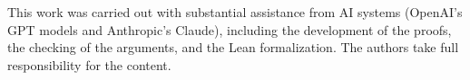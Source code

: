 This work was carried out with substantial assistance from AI systems (OpenAI's GPT models and
Anthropic's Claude), including the development of the proofs, the checking of the arguments, and
the Lean formalization. The authors take full responsibility for the content.
